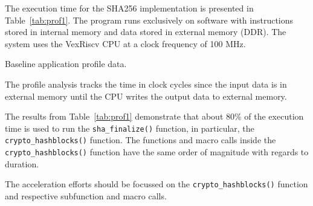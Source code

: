 The execution time for the SHA256 implementation \cite{iob-soc-sha} is
presented in Table~\ref{tab:prof1}. The program runs exclusively on software
with instructions stored in internal memory and data stored in external memory
(DDR). The system uses the VexRiscv CPU \cite{iob-vexriscv} at a clock
frequency of 100 MHz.

\begin{table}[h]
    \centering
    
    \caption{Baseline application profile data.}
    \label{tab:prof1}
\end{table}

The profile analysis tracks the time in clock cycles since the input data is in
external memory until the CPU writes the output data to external memory.

The results from Table~\ref{tab:prof1} demonstrate that about 80\% of the
execution time is used to run the \texttt{sha\_finalize()} function, in
particular, the \texttt{crypto\_hashblocks()} function. The functions and macro
calls inside the \texttt{crypto\_hashblocks()} function have the same order of
magnitude with regards to duration.

The acceleration efforts should be focussed on the
\texttt{crypto\_hashblocks()} function and respective subfunction and macro
calls.
